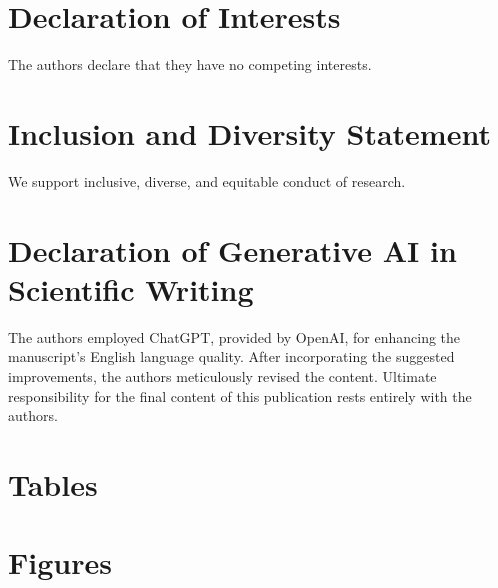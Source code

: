 \documentclass[preprint,review,12pt]{elsarticle}%
\begin{document}
\begin{frontmatter}
\section*{Declaration of Interests}
The authors declare that they have no competing interests.
\label{declaration of interests}

\section*{Inclusion and Diversity Statement}
We support inclusive, diverse, and equitable conduct of research.
\label{inclusion and diversity statement}

\section*{Declaration of Generative AI in Scientific Writing}
The authors employed ChatGPT, provided by OpenAI, for enhancing the manuscript's English language quality. After incorporating the suggested improvements, the authors meticulously revised the content. Ultimate responsibility for the final content of this publication rests entirely with the authors.
\label{declaration of generative ai in scientific writing}


\clearpage
\section*{Tables}
\label{tables}


\clearpage
\section*{Figures}
\label{figures}


\end{frontmatter}
\end{document}
